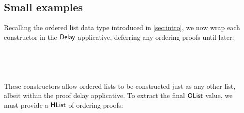 \documentclass[sigplan]{acmart}%
\begin{document}
\subsection{Small examples}
Recalling the ordered list data type introduced in \autoref{sec:intro}, we now wrap each constructor 
in the $\AgdaDatatype{Delay}$ applicative, deferring any ordering proofs until later:
\begin{code}
\>[2]\AgdaSpace{}%
\AgdaSymbol{:}\AgdaSpace{}%
\AgdaSpace{}%
\AgdaSymbol{(}\AgdaSpace{}%
\AgdaSpace{}%
\AgdaSymbol{)}\<%
\\
%
\>[2]\AgdaSpace{}%
\AgdaSymbol{=}\AgdaSpace{}%
\AgdaSpace{}%
\AgdaSpace{}%
\AgdaSpace{}%
\<%
%
\end{code}
\begin{code}
\>[2]\AgdaSpace{}%
\AgdaSymbol{:}\AgdaSpace{}%
\AgdaSymbol{(}\AgdaSpace{}%
\AgdaSymbol{:}\AgdaSpace{}%
\AgdaSymbol{)}\AgdaSpace{}%
\AgdaSpace{}%
\AgdaSpace{}%
\AgdaSymbol{(}\AgdaSpace{}%
\AgdaSpace{}%
\AgdaSymbol{)}\AgdaSpace{}%
\AgdaSpace{}%
\AgdaSpace{}%
\AgdaSymbol{(}\AgdaSpace{}%
\AgdaSpace{}%
\AgdaSymbol{)}\<%
\\
%
\>[2]\AgdaSpace{}%
\AgdaSpace{}%
\AgdaSpace{}%
\AgdaSymbol{=}\AgdaSpace{}%
\AgdaSpace{}%
\AgdaSymbol{(}\AgdaSpace{}%
\AgdaSymbol{)}\AgdaSpace{}%
\AgdaSpace{}%
\AgdaSpace{}%
\<%
\end{code}
These constructors allow ordered lists to be constructed just as any other list, albeit 
within the proof delay applicative. To extract the final $\AgdaDatatype{OList}$ value, we must 
provide a $\AgdaDatatype{HList}$ of ordering proofs:
\end{document}

